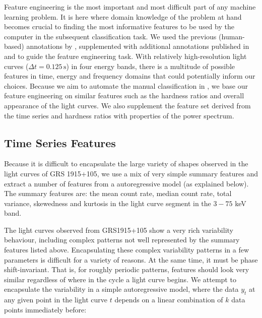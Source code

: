\documentclass[12pt]{emulateapj}
\begin{document}
Feature engineering is the most important and most difficult part of any machine learning problem. It is here where domain knowledge of the problem at hand becomes crucial to finding the most informative features to be used by the computer in the subsequent classification task. 
We used the previous (human-based) annotations by \citet{belloni2000}, supplemented with additional annotations published in \citet{kleinwolt2002} and \citet{hannikainen2003} to guide the feature engineering task. With relatively high-resolution light curves ($\Delta t = 0.125 \,\mathrm{s}$) in four energy bands, there is a multitude of possible features in time, energy and frequency domains that could potentially inform our choices. Because we aim to automate the manual classification in \citet{belloni2000}, we base our feature engineering on similar features such as the hardness ratios and overall appearance of the light curves. We also supplement the feature set derived from the time series and hardness ratios with properties of the power spectrum.

\subsection{Time Series Features}

Because it is difficult to encapsulate the large variety of shapes observed in the light curves of GRS 1915+105, we use a mix of very simple summary features and extract a number of features from a autoregressive model (as explained below). The summary features are: the mean count rate, median count rate, total variance, skewedness and kurtosis in the light curve segment in the $3 - 75$ keV band. 


The light curves observed from GRS1915+105 show a very rich variability behaviour, including complex patterns not well represented by the summary features listed above. Encapsulating these complex variability patterns in a few parameters is difficult for a variety of reasons. At the same time, it must be phase shift-invariant. That is, for roughly periodic patterns, features should look very similar regardless of where in the cycle a light curve begins. We attempt to encapsulate the variability in a simple autoregressive model, where the data $y_t$ at any given point in the light curve $t$ depends on a linear combination of $k$ data points immediately before:
\end{document}
